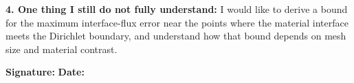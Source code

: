 \begin{formbox}
\textbf{4. One thing I still do not fully understand:} I would like to
derive a bound for the maximum interface-flux error near the points where
the material interface meets the Dirichlet boundary, and understand how that
bound depends on mesh size and material contrast.

\vfill
\textbf{Signature:} \underline{\hspace{4.5cm}} \hfill
\textbf{Date:} \underline{\hspace{2.5cm}}
\end{formbox}
